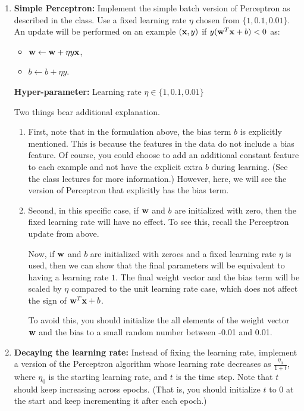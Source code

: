 \begin{enumerate}
\item \textbf{Simple Perceptron:} Implement the simple batch version
  of Perceptron as described in the class. Use a fixed learning rate
  $\eta$ chosen from $\{1,0.1,0.01\}$. An update will be performed on
  an example $({\bf x}, y)$ if $y({\bf w}^T{\bf x} + b) < 0$ as:
  \begin{itemize}
  \item[] ${\bf w} \leftarrow {\bf w} + \eta y {\bf x}$,
  \item[] $b \leftarrow b + \eta y$.
  \end{itemize}

  \textbf{Hyper-parameter:} Learning rate $\eta\in\{1,0.1,0.01\}$

  Two things bear additional explanation. 

  \begin{enumerate}
  \item First, note that in the formulation above, the bias term $b$
    is explicitly mentioned. This is because the features in the data
    do not include a bias feature. Of course, you could choose to add
    an additional constant feature to each example and not have the
    explicit extra $b$ during learning. (See the class lectures for
    more information.) However, here, we will see the version of
    Perceptron that explicitly has the bias term.
  \item Second, in this specific case, if ${\bf w}$ and $b$ are
    initialized with zero, then the fixed learning rate will have no
    effect. To see this, recall the Perceptron update from above.
    
    Now, if ${\bf w}$ and $b$ are initialized with zeroes and a fixed
    learning rate $\eta$ is used, then we can show that the final
    parameters will be equivalent to having a learning rate $1$. The
    final weight vector and the bias term will be scaled by $\eta$
    compared to the unit learning rate case, which does not affect the
    sign of ${\bf w}^T{\bf x} + b$.
    
    To avoid this, you should initialize the all elements of the
    weight vector ${\bf w}$ and the bias to a small random number between
    -0.01 and 0.01.
    
  \end{enumerate}

\item \textbf{Decaying the learning rate:} Instead of fixing the
  learning rate, implement a version of the Perceptron algorithm
  whose learning rate decreases as $\frac{\eta_0}{1+t}$, where
  $\eta_0$ is the starting learning rate, and $t$ is the time
  step. Note that $t$ should keep increasing across epochs. (That
  is, you should initialize $t$ to $0$ at the start and keep
  incrementing it after each epoch.)


\end{enumerate}
